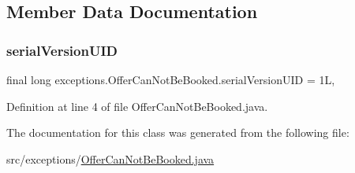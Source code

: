 \begin{DoxyCode}{0}

\end{DoxyCode}


\subsection{Member Data Documentation}
\mbox{\label{classexceptions_1_1OfferCanNotBeBooked_a0f0deac6a5fe9077f31bd1c90f1b0b59}} 
\subsubsection{\texorpdfstring{serialVersionUID}{serialVersionUID}}
{\footnotesize\ttfamily final long exceptions.\+Offer\+Can\+Not\+Be\+Booked.\+serial\+Version\+U\+ID = 1L\hspace{0.3cm}{\ttfamily [static]}, {\ttfamily [private]}}



Definition at line 4 of file Offer\+Can\+Not\+Be\+Booked.\+java.



The documentation for this class was generated from the following file\+:\begin{DoxyCompactItemize}
\item 
src/exceptions/\mbox{\hyperlink{OfferCanNotBeBooked_8java}{Offer\+Can\+Not\+Be\+Booked.\+java}}\end{DoxyCompactItemize}

